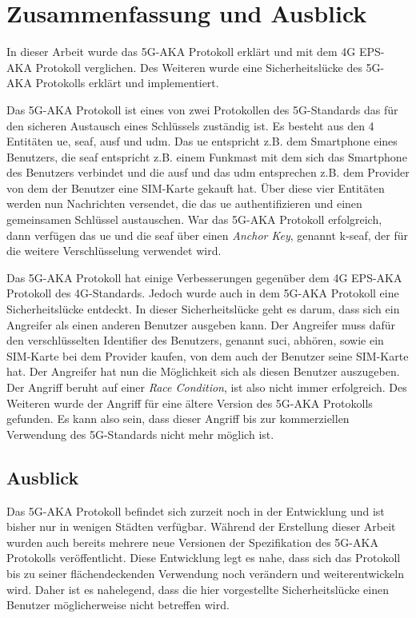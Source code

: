 \chapter{Zusammenfassung und Ausblick}
\label{chap:6}

In dieser Arbeit wurde das 5G-AKA Protokoll erklärt und mit dem 4G EPS-AKA Protokoll verglichen.
Des Weiteren wurde eine Sicherheitslücke des 5G-AKA Protokolls erklärt und implementiert.

Das 5G-AKA Protokoll ist eines von zwei Protokollen des 5G-Standards das für den sicheren Austausch eines Schlüssels zuständig ist.
Es besteht aus den 4 Entitäten \gls{ue}, \gls{seaf}, \gls{ausf} und \gls{udm}.
Das \gls{ue} entspricht z.B. dem Smartphone eines Benutzers, die \gls{seaf} entspricht z.B. einem Funkmast mit dem sich das Smartphone des Benutzers verbindet und die \gls{ausf} und das \gls{udm} entsprechen z.B. dem Provider von dem der Benutzer eine SIM-Karte gekauft hat.
Über diese vier Entitäten werden nun Nachrichten versendet, die das \gls{ue} authentifizieren und einen gemeinsamen Schlüssel austauschen.
War das 5G-AKA Protokoll erfolgreich, dann verfügen das \gls{ue} und die \gls{seaf} über einen \textit{Anchor Key}, genannt \gls{k-seaf}, der für die weitere Verschlüsselung verwendet wird.

Das 5G-AKA Protokoll hat einige Verbesserungen gegenüber dem 4G EPS-AKA Protokoll des 4G-Standards.
Jedoch wurde auch in dem 5G-AKA Protokoll eine Sicherheitslücke entdeckt.
In dieser Sicherheitslücke geht es darum, dass sich ein Angreifer als einen anderen Benutzer ausgeben kann.
Der Angreifer muss dafür den verschlüsselten Identifier des Benutzers, genannt \gls{suci}, abhören, sowie ein SIM-Karte bei dem Provider kaufen, von dem auch der Benutzer seine SIM-Karte hat.
Der Angreifer hat nun die Möglichkeit sich als diesen Benutzer auszugeben.
Der Angriff beruht auf einer \textit{Race Condition}, ist also nicht immer erfolgreich.
Des Weiteren wurde der Angriff für eine ältere Version des 5G-AKA Protokolls gefunden.
Es kann also sein, dass dieser Angriff bis zur kommerziellen Verwendung des 5G-Standards nicht mehr möglich ist.


\section*{Ausblick}
Das 5G-AKA Protokoll befindet sich zurzeit noch in der Entwicklung und ist bisher nur in wenigen Städten verfügbar.
Während der Erstellung dieser Arbeit wurden auch bereits mehrere neue Versionen der Spezifikation des 5G-AKA Protokolls veröffentlicht.
Diese Entwicklung legt es nahe, dass sich das Protokoll bis zu seiner flächendeckenden Verwendung noch verändern und weiterentwickeln wird.
Daher ist es nahelegend, dass die hier vorgestellte Sicherheitslücke einen Benutzer möglicherweise nicht betreffen wird.
